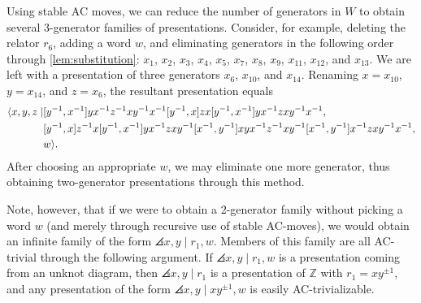 Using stable AC moves, we can reduce the number of generators in $W$ to obtain several 3-generator families of presentations. Consider, for example, deleting the relator $r_6$, adding a word $w$, and eliminating generators in the following order through \autoref{lem:substitution}: $x_1$, $x_2$, $x_3$, $x_4$, $x_5$, $x_7$, $x_8$, $x_9$, $x_{11}$, $x_{12}$, and $x_{13}$. We are left with a presentation of three generators $x_6$, $x_{10}$, and $x_{14}$. Renaming $x = x_{10}$, $y = x_{14}$, and $z=x_6$, the resultant presentation equals
\[
\begin{aligned}
\angles{x, y, z \mid & 
[y^{-1}, x^{-1}]
y x^{-1} z^{-1} x y^{-1} x^{-1} [y^{-1}, x]
z x [y^{-1}, x^{-1}]
y x^{-1} z x y^{-1} x^{-1}, \\
& %
[y^{-1}, x] z^{-1} x 
[y^{-1}, x^{-1}]
y x^{-1} z x y^{-1} 
[x^{-1}, y^{-1}]
x y x^{-1} z^{-1} x y^{-1} 
[x^{-1}, y^{-1}]
x^{-1} z x y^{-1} x^{-1}, \\
& w}.
\end{aligned}
\]
After choosing an appropriate $w$, we may eliminate one more generator, thus obtaining two-generator presentations through this method. 

\begin{remark}
Note, however, that if we were to obtain a 2-generator family without picking a word $w$ (and merely through recursive use of stable AC-moves), we would obtain an infinite family of the form $\angles{ x,y \mid r_1,w }$. Members of this family are all AC-trivial through the following argument. If $\angles{ x,y \mid r_1,w }$ is a presentation coming from an unknot diagram, then $\angles{ x,y \mid r_1 }$ is a presentation of $\mathbb{Z}$ with $r_1 = xy^{\pm 1}$, and any presentation of the form $\angles{ x,y \mid xy^{\pm 1},w }$ is easily AC-trivializable.
\end{remark}



